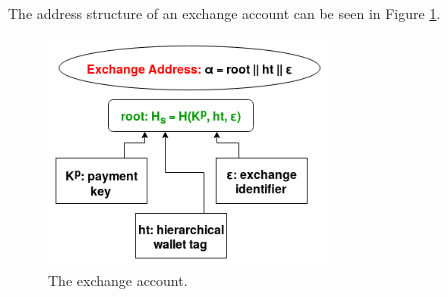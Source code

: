 The address structure of an exchange account can be seen in Figure \ref{fig:exchange_account_plain}.

\begin{figure}
  \begin{center}
    \includegraphics[width=210pt]{exchange_account_plain.png}
  \end{center}
  \caption{The exchange account.}
  \label{fig:exchange_account_plain}
\end{figure}